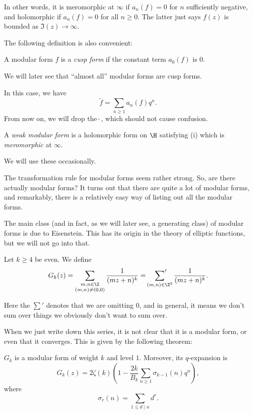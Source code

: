 \documentclass[a4paper]{article}
\begin{document}
In other words, it is meromorphic at $\infty$ if $a_n(f) = 0$ for $n$ sufficiently negative, and holomorphic if $a_n(f) = 0$ for all $n \geq 0$. The latter just says $f(z)$ is bounded as $\Im(z) \to \infty$.

The following definition is also convenient:
\begin{defi}
  A modular form $f$ is a \emph{cusp form} if the constant term $a_0(f)$ is $0$.
\end{defi}
We will later see that ``almost all'' modular forms are cusp forms.

In this case, we have
\[
  \tilde{f} = \sum_{n\geq 1} a_n(f) q^n.
\]
From now on, we will drop the $\tilde{\;}$, which should not cause confusion.

\begin{defi}
  A \emph{weak modular form} is a holomorphic form on $\H$ satisfying (i) which is \emph{meromorphic} at $\infty$.
\end{defi}
We will use these occasionally.

The transformation rule for modular forms seem rather strong. So, are there actually modular forms? It turns out that there are quite a lot of modular forms, and remarkably, there is a relatively easy way of listing out all the modular forms.

The main class (and in fact, as we will later see, a generating class) of modular forms is due to Eisenstein. This has its origin in the theory of elliptic functions, but we will not go into that.

\begin{defi}
  Let $k \geq 4$ be even. We define
  \[
    G_k(z) = \sum_{\substack{m, n \in \Z\\ (m, n) \not= (0, 0)}} \frac{1}{(mz + n)^k} = \sideset{}{'}\sum_{(m, n) \in \Z^2} \frac{1}{(mz + n)^k}.
  \]
\end{defi}
Here the $\sum'$ denotes that we are omitting $0$, and in general, it means we don't sum over things we obviously don't want to sum over.

When we just write down this series, it is not clear that it is a modular form, or even that it converges. This is given by the following theorem:
\begin{thm}
  $G_k$ is a modular form of weight $k$ and level $1$. Moreover, its $q$-expansion is
  \[
    G_k(z) = 2 \zeta(k) \left(1 - \frac{2k}{B_k} \sum_{n \geq 1} \sigma_{k - 1}(n) q^n\right),\tag{$1$}
  \]
  where
  \[
    \sigma_r(n) = \sum_{1 \leq d \mid n} d^r.
  \]
\end{thm}
\end{document}
